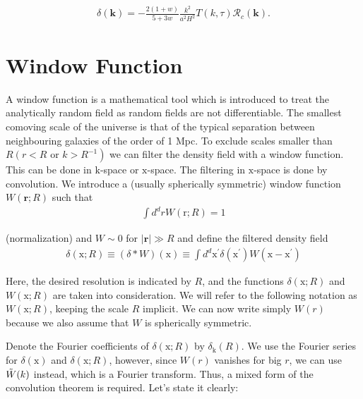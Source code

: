 \begin{appendices}
\begin{align}
    \delta(\mathbf{k})=-\frac{2(1+w)}{5+3 w} \frac{k^{2}}{a^{2} H^{2}} T(k, \tau) \mathcal{R}_{c}(\mathbf{k}) .
\end{align}










\chapter{Window Function}\label{Window function}
A window function is a mathematical tool which is introduced to treat the analytically random field as random fields are not differentiable.
The smallest comoving scale of the universe is that of the typical separation between neighbouring galaxies of the order of 1 Mpc.
To exclude scales smaller than $R\left(r<R\right.$ or $\left. k>R^{-1}\right)$ we can filter the density field with a window function. This can be done in $\mathrm{k}$-space or $\mathrm{x}$-space.
The filtering in $\mathrm{x}$-space is done by convolution. We introduce a (usually spherically symmetric) window function $W(\mathbf{r} ; R)$ such that
\begin{align}
   \int d^d r W(\mathrm{r} ; R)=1 \label{c1}
\end{align}

(normalization) and $W \sim 0$ for $|\mathbf{r}| \gg R$ and define the filtered density field
\begin{align}
    \delta(\mathrm{x} ; R) \equiv(\delta * W)(\mathrm{x}) \equiv \int d^d \mathrm{x}^{\prime} \delta\left(\mathrm{x}^{\prime}\right) W\left(\mathrm{x}-\mathrm{x}^{\prime}\right)
\end{align}

Here, the desired resolution is indicated by $R$, and the functions $\delta(\mathrm{x}; R)$ and $W(\mathrm{x}; R)$ are taken into consideration. We will refer to the following notation as $W(\mathrm{x}; R)$, keeping the scale $R$ implicit. We can now write simply $W(r)$ because we also assume that $W$ is spherically symmetric.

Denote the Fourier coefficients of $\delta(\mathrm{x} ; R)$ by $\delta_{\mathrm{k}}(R)$. We use the Fourier series for $\delta(\mathrm{x})$ and $\delta(\mathrm{x}; R)$, however, since $W(r)$ vanishes for big $r$, we can use $ \Tilde{W}(k)$ instead, which is a Fourier transform. Thus, a mixed form of the convolution theorem is required. Let's state it clearly:


\end{appendices}
